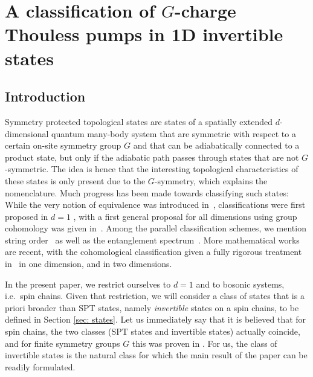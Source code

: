 \chapter{A classification of \texorpdfstring{$G$}{G}-charge Thouless pumps in 1D invertible states}\label{ch:LoopSPT}
\section{Introduction}   \label{sec: introduction}

Symmetry protected topological states are states of a spatially extended $d$-dimensional quantum many-body system that are symmetric with respect to a certain on-site symmetry group $G$ and that can be adiabatically connected to a product state, but only if the adiabatic path passes through states that are not $G$-symmetric. The idea is hence that the interesting topological characteristics of these states is only present due to the $G$-symmetry, which explains the nomenclature. Much progress has been made towards classifying such states: While the very notion of equivalence was introduced in~\cite{chen2010local}, classifications were first proposed in $d=1$ \cite{chen_gu_wen_2011,schuch2011classifying,pollmann2012symmetry}, with a first general proposal for all dimensions using group cohomology was given in~\cite{Chen_2013}. Among the parallel classification schemes, we mention string order~\cite{nijs:1989a,perez2008string} as well as the entanglement spectrum~\cite{li2008entanglement,pollmann2010entanglement}. More mathematical works are recent, with the cohomological classification given a fully rigorous treatment in~\cite{OgataZ2,ogata2021classification,kapustin2021classification} in one dimension, and \cite{Ogata2d,sopenko2021index} in two dimensions.  

In the present paper, we restrict ourselves to $d=1$ and to bosonic systems, i.e.\ spin chains. Given that restriction, we will consider a class of states that is a priori broader than SPT states, namely \emph{invertible} states on a spin chains, to be defined in Section \ref{sec: states}.  Let us immediately say that it is believed that for spin chains, the two classes (SPT states and invertible states) actually coincide, and for finite symmetry groups $G$ this was proven in \cite{kapustin2021classification}. For us, the class of invertible states is the natural class for which the main result of the paper can be readily formulated. 

